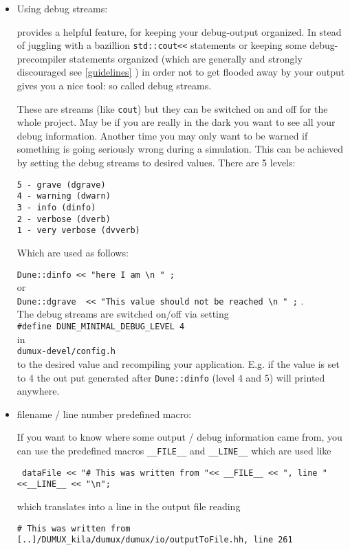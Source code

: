 \begin{itemize}
\item Using \Dune debug streams:

  \Dune provides a helpful feature, for keeping your debug-output organized. 
  In stead of juggling with a bazillion \verb+std::cout<<+ statements or keeping some debug-precompiler statements organized (which are generally and strongly discouraged see \ref{guidelines} ) in order not to get 
  flooded away by your output \Dune gives you a nice tool: so called debug streams. 

  These are streams (like \verb+cout+) but they can be switched on and off for the whole project. 
  May be if you are really in the  dark you want to see all your debug information. Another time you may only want to be warned if something is going seriously wrong during a simulation. 
  This can be achieved by setting the debug streams to desired values. There are 5 levels:
\begin{verbatim}
5 - grave (dgrave)
4 - warning (dwarn)
3 - info (dinfo)
2 - verbose (dverb)
1 - very verbose (dvverb)
\end{verbatim}
Which are used as follows:

\verb+Dune::dinfo << "here I am \n " ;+\\
or \\
\verb+Dune::dgrave  << "This value should not be reached \n " ;+ . \\
The debug streams are switched on/off via  setting  \\
\verb+#define DUNE_MINIMAL_DEBUG_LEVEL 4 + \\ 
in \\
\verb+dumux-devel/config.h+ \\
to the desired value and recompiling your application. E.g. if the value is set to 4 the out put generated after \verb+Dune::dinfo+ (level 4 and 5) will printed anywhere. 

 \item filename / line number predefined macro:

If you want to  know where some output / debug information came from, you can use the predefined macros \verb+__FILE__+ and \verb+__LINE__+ 
which are used like            

\verb+ dataFile << "# This was written from "<< __FILE__ << ", line " <<__LINE__ << "\n";+

which translates into a line in the output file reading 

\verb+# This was written from [..]/DUMUX_kila/dumux/dumux/io/outputToFile.hh, line 261+


\end{itemize}
